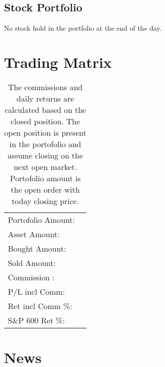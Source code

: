 \documentclass{tufte-handout}\usepackage[]{graphicx}\usepackage[]{color}
\begin{document}
\subsection{Stock Portfolio}
No stock hold in the portfolio at the end of the day.


\section{Trading Matrix}

\begin{table}[ht]
\begin{tabular}{lr}
   \hline
Portofolio Amount: &  \\ 
  Asset Amount: &  \\ 
  Bought Amount: &  \\ 
  Sold   Amount: &  \\ 
  Commission   : &  \\ 
  P/L incl Comm: &  \\ 
  Ret incl Comm \%: &  \\ 
  S\&P 600 Ret \%: &  \\ 
   \hline
\end{tabular}
\caption{The commissions and daily returns are calculated based on the closed position.
The open position is present in the portofolio and assume closing on the next open market.
Portofolio amount is the open order with today closing price.} 
\end{table}



% 
% 

\newpage
\section{News}

\end{document}
